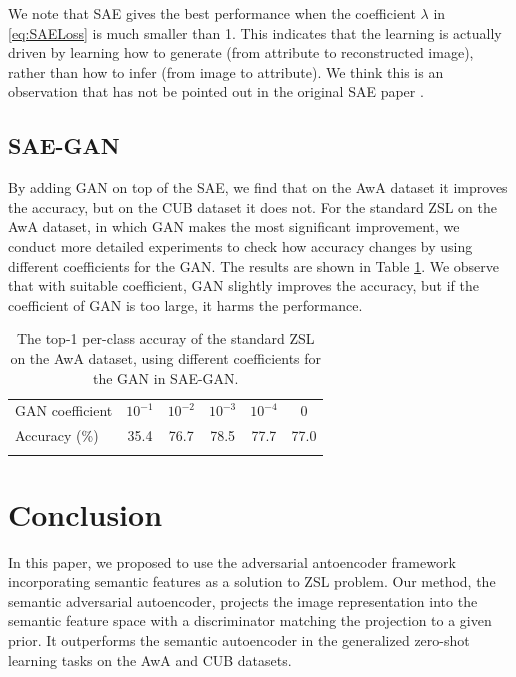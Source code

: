 \documentclass{article}
\begin{document}
We note that SAE gives the best performance when the coefficient $\lambda$ in \eqref{eq:SAELoss} is much smaller than 1. This indicates that the learning is actually driven by learning how to generate (from attribute to reconstructed image), rather than how to infer (from image to attribute). We think this is an observation that has not be pointed out in the original SAE paper \cite{kodirov2017semantic}.


\subsection{SAE-GAN}

By adding GAN on top of the SAE, we find that on the AwA dataset it improves the accuracy, but on the CUB dataset it does not. For the standard ZSL on the AwA dataset, in which GAN makes the most significant improvement, we conduct more detailed experiments to check how accuracy changes by using different coefficients for the GAN. The results are shown in Table \ref{tab:SAEGAN}. We observe that with suitable coefficient, GAN slightly improves the accuracy, but if the coefficient of GAN is too large, it harms the performance.


\begin{table}[t]
\centering
\begin{tabular}{lccccc}
\toprule
GAN coefficient & $10^{-1}$ & $10^{-2}$ & $10^{-3}$ & $10^{-4}$ & 0 \\
Accuracy (\%) & 35.4 & 76.7 & 78.5 & 77.7 & 77.0 \\
\bottomrule \\
\end{tabular}
\caption{The top-1 per-class accuray of the standard ZSL on the AwA dataset, using different coefficients for the GAN in SAE-GAN.}
\label{tab:SAEGAN}
\end{table}



\section{Conclusion}

In this paper, we proposed to use the adversarial antoencoder framework incorporating semantic features as a solution to ZSL problem. Our method, the semantic adversarial autoencoder, projects the image representation into the semantic feature space with a discriminator matching the projection to a given prior. It outperforms the semantic autoencoder in the generalized zero-shot learning tasks on the AwA and CUB datasets.


\newpage



\end{document}

